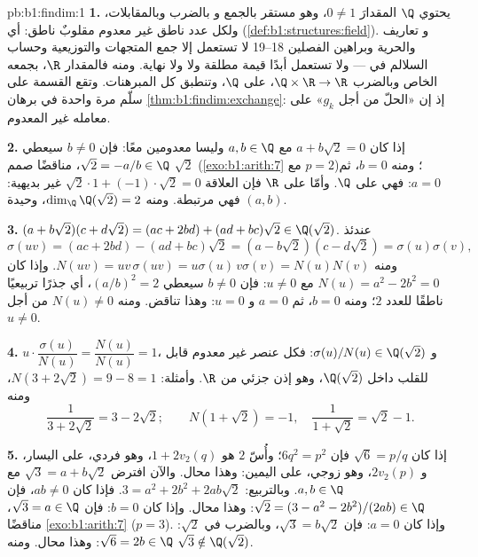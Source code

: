 \begin{solution}{pb:b1:findim:1}
\textbf{1.} يحتوي $\Q$ المقدارَ $0 \neq 1$، وهو مستقر بالجمع و
بالضرب وبالمقابلات، ولكل عدد ناطق غير معدوم
مقلوبٌ ناطق: أي  (\cref{def:b1:structures:field}). و
تعاريف  والحرية  وبراهين الفصلين
18--19 لا تستعمل إلا جمع المتجهات والتوزيعية وحساب
السلالم في  --- ولا تستعمل أبدًا قيمة مطلقة ولا  ولا
نهاية. ومنه فالمقدار $\R$، بجمعه الخاص وبالضرب
$\Q \times \R \to \R$،  على $\Q$، وتنطبق كل
المبرهنات. وتقع القسمة على سلّم مرة واحدة في برهان
\cref{thm:b1:findim:exchange}: إذ إن «الحلّ من أجل $g_k$» 
على معامله غير المعدوم.

\textbf{2.} إذا كان $a + b\sqrt2 = 0$ مع $a, b \in \Q$ وليسا معدومين
معًا: فإن $b \neq 0$ سيعطي $\sqrt2 = -a/b \in \Q$، مناقضًا
صمم $\sqrt2$ (\cref{exo:b1:arith:7} مع $p =
2$)؛ ومنه $b = 0$، ثم $a = 0$: فهي  على $\Q$. وأمّا على $\R$ فإن
العلاقة $\sqrt2\cdot 1 + (-1)\cdot\sqrt2 = 0$ غير بديهية:
فهي مرتبطة. ومنه $\dim_\Q \Q(\sqrt2) = 2$،  وحيدة
$(a, b)$.

\textbf{3.} $(a + b\sqrt2)(c + d\sqrt2) = (ac + 2bd) + (ad +
bc)\sqrt2 \in \Q(\sqrt2)$. عندئذ
\[
\sigma(uv) = (ac + 2bd) - (ad + bc)\sqrt2
= (a - b\sqrt2)(c - d\sqrt2) = \sigma(u)\sigma(v),
\]
ومنه $N(uv) = uv\,\sigma(uv) = u\sigma(u)\,v\sigma(v) = N(u)N(v)$.
وإذا كان $N(u) = a^2 - 2b^2 = 0$ مع $u \neq 0$: فإن $b \neq 0$ سيعطي
$(a/b)^2 = 2$، أي جذرًا تربيعيًا ناطقًا للعدد $2$؛ ومنه $b = 0$، ثم $a
= 0$ و $u = 0$: وهذا تناقض. ومنه $N(u) \neq 0$ من أجل $u \neq
0$.

\textbf{4.} $u \cdot \dfrac{\sigma(u)}{N(u)} = \dfrac{N(u)}{N(u)}
= 1$، و $\sigma(u)/N(u) \in \Q(\sqrt2)$: فكل عنصر غير معدوم
قابل للقلب داخل $\Q(\sqrt2)$، وهو إذن  جزئي
من $\R$. وأمثلة: $N(3 + 2\sqrt2) = 9 - 8 = 1$، ومنه
\[
\frac1{3 + 2\sqrt2} = 3 - 2\sqrt2 ;
\qquad
N(1 + \sqrt2) = -1, \quad
\frac1{1 + \sqrt2} = \sqrt2 - 1 .
\]

\textbf{5.} إذا كان $\sqrt6 = p/q$ فإن $6q^2 = p^2$؛ وأُسّ
$2$ هو $1 + 2v_2(q)$، وهو فردي، على اليسار، و $2v_2(p)$، وهو زوجي، على
اليمين: وهذا محال. والآن افترض $\sqrt3 = a + b\sqrt2$ مع
$a, b \in \Q$. وبالتربيع: $3 = a^2 + 2b^2 + 2ab\sqrt2$. فإذا كان $ab
\neq 0$، فإن $\sqrt2 = (3 - a^2 - 2b^2)/(2ab) \in \Q$:
وهذا محال. وإذا كان $b = 0$: فإن $\sqrt3 = a \in \Q$، مناقضًا
\cref{exo:b1:arith:7} ($p = 3$). وإذا كان $a = 0$: فإن $\sqrt3 = b\sqrt2$،
وبالضرب في $\sqrt2$: $\sqrt6 = 2b \in \Q$: وهذا محال.
ومنه $\sqrt3 \notin \Q(\sqrt2)$.


\end{solution}
